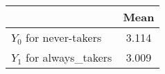 \begin{tabular}{l*{1}{c}}
\hline\hline
            &        Mean\\
\hline
$ Y_0 $ for never-takers&       3.114\\
$ Y_1 $ for always_takers&       3.009\\
\hline\hline
\end{tabular}
